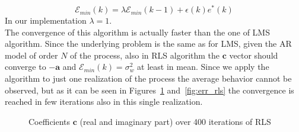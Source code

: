 \documentclass[10pt]{article}
\numberwithin{equation}{section}
\begin{document}
\begin{equation}
  \mathcal{E}_{min}(k) = \lambda \mathcal{E}_{min}(k-1) + \epsilon(k)e^*(k)
\end{equation}
In our implementation $\lambda = 1$. \\
The convergence of this algorithm is actually faster than the one of LMS algorithm. Since the underlying problem is the same as for LMS, given the AR model of order $N$ of the process, also in RLS algorithm the $\mathbf{c}$ vector should converge to $-\mathbf{a}$ and $\mathcal{E}_{min}(k) = \sigma_w^2$ at least in mean. Since we apply the algorithm to just one realization of the process the average behavior cannot be observed, but as it can be seen in Figures~\ref{fig:rls_coeff} and~\ref{fig:err_rls} the convergence is reached in few iterations also in this single realization.

\begin{figure}[h!]
\centering

  \caption{Coefficients $\mathbf{c}$ (real and imaginary part) over 400 iterations of RLS}
  \label{fig:rls_coeff}
\end{figure}
\end{document}

